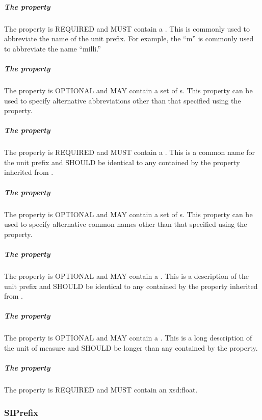 \subparagraph{The  property}\label{sec:symbol:Prefix}
The  property is REQUIRED and MUST contain a . This  is commonly used to abbreviate the name of the unit prefix. For example, the  ``m'' is commonly used to abbreviate the name ``milli.''

\subparagraph{The  property}\label{sec:alternativeSymbols:Prefix}
The  property is OPTIONAL and MAY contain a set of s. This property can be used to specify alternative abbreviations other than that specified using the  property.

\subparagraph{The  property}\label{sec:label:Prefix}
The  property is REQUIRED and MUST contain a . This  is a common name for the unit prefix and SHOULD be identical to any  contained by the  property inherited from .

\subparagraph{The  property}\label{sec:alternativeLabels:Prefix}
The  property is OPTIONAL and MAY contain a set of s. This property can be used to specify alternative common names other than that specified using the  property.

\subparagraph{The  property}\label{sec:comment:Prefix}
The  property is OPTIONAL and MAY contain a . This  is a description of the unit prefix and SHOULD be identical to any  contained by the  property inherited from .

\subparagraph{The  property}\label{sec:longcomment:Prefix}
The  property is OPTIONAL and MAY contain a . This  is a long description of the unit of measure and SHOULD be longer than any  contained by the  property.

\subparagraph{The  property}\label{sec:hasFactor:Prefix}
The  property is REQUIRED and MUST contain an xsd:float.

\subsubsection{SIPrefix}
\label{sec:SIPrefix}

